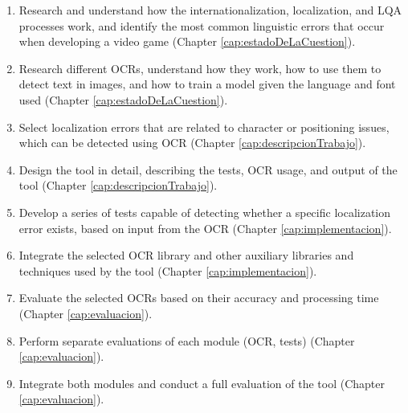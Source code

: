 \begin{enumerate}
	\item Research and understand how the internationalization, localization, and LQA processes work, and identify the most common linguistic errors that occur when developing a video game (Chapter \ref{cap:estadoDeLaCuestion}).
	\item Research different OCRs, understand how they work, how to use them to detect text in images, and how to train a model given the language and font used (Chapter \ref{cap:estadoDeLaCuestion}).
	\item Select localization errors that are related to character or positioning issues, which can be detected using OCR (Chapter \ref{cap:descripcionTrabajo}).
	\item Design the tool in detail, describing the tests, OCR usage, and output of the tool (Chapter \ref{cap:descripcionTrabajo}).
	\item Develop a series of tests capable of detecting whether a specific localization error exists, based on input from the OCR (Chapter \ref{cap:implementacion}).
	\item Integrate the selected OCR library and other auxiliary libraries and techniques used by the tool (Chapter \ref{cap:implementacion}).
	\item Evaluate the selected OCRs based on their accuracy and processing time (Chapter \ref{cap:evaluacion}).
	\item Perform separate evaluations of each module (OCR, tests) (Chapter \ref{cap:evaluacion}).
	\item Integrate both modules and conduct a full evaluation of the tool (Chapter \ref{cap:evaluacion}).
\end{enumerate}








